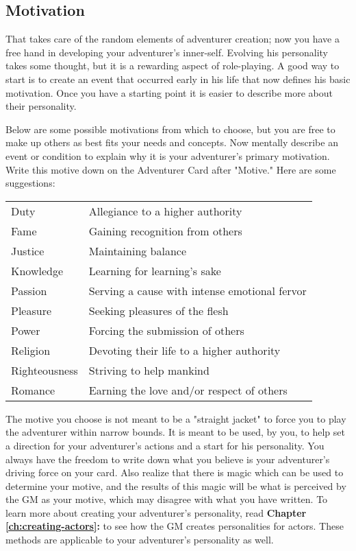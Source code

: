 \begin{multicols*}{2}
\section{Motivation}
That takes care of the random elements of adventurer creation; now you have a free hand in developing your adventurer's inner-self. Evolving his personality takes some thought, but it is a rewarding aspect of role-playing. A good way to start is to create an event that occurred early in his life that now defines his basic motivation. Once you have a starting point it is easier to describe more about their personality.

Below are some possible motivations from which to choose, but you are free to make up others as best fits your needs and concepts. Now mentally describe an event or condition to explain why it is your adventurer's primary motivation. Write this motive down on the Adventurer Card after "Motive." Here are some suggestions:
\begin{normbox}[Motivation]
\begin{tabularx}{\linewidth}{@{} l L}
\small
Duty & Allegiance to a higher authority\\
Fame & Gaining recognition from others\\
Justice & Maintaining balance\\
Knowledge & Learning for learning's sake\\
Passion & Serving a cause with intense emotional fervor\\
Pleasure & Seeking pleasures of the flesh\\
Power & Forcing the submission of others\\
Religion & Devoting their life to a higher authority\\
Righteousness & Striving to help mankind\\
Romance & Earning the love and/or respect of others
\end{tabularx}
\end{normbox}
\normalsize
The motive you choose is not meant to be a "straight jacket" to force you to play the adventurer within narrow bounds. It is meant to be used, by you, to help set a direction for your adventurer's actions and a start for his personality. You always have the freedom to write down what you believe is your adventurer's driving force on your card. Also realize that there is magic which can be used to determine your motive, and the results of this magic will be what is perceived by the GM as your motive, which may disagree with what you have written.
To learn more about creating your adventurer's personality, read \textbf{Chapter \ref{ch:creating-actors}: } to see how the GM creates personalities for actors. These methods are applicable to your adventurer's personality as well.

\end{multicols*}
